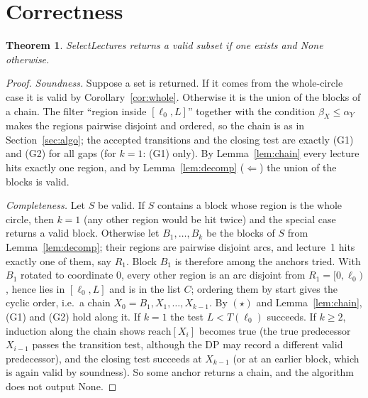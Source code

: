 \documentclass[11pt,a4paper]{article}
\newtheorem{theorem}{Theorem}
\theoremstyle{definition}
\theoremstyle{remark}
\newcommand{\Tf}{T}
\begin{document}
\section{Correctness}\label{sec:correct}
\begin{theorem}\label{thm:main}
\textsf{SelectLectures} returns a valid subset if one exists and \textsf{None} otherwise.
\end{theorem}
\begin{proof}
\emph{Soundness.} Suppose a set is returned.  If it comes from the whole-circle case it
is valid by Corollary~\ref{cor:whole}.  Otherwise it is the union of the blocks of a
chain.  The filter ``region inside $[\ell_0,L]$'' together with the condition
$\beta_X\le\alpha_Y$ makes the regions pairwise disjoint and ordered, so the chain is as
in Section~\ref{sec:algo}; the accepted transitions and the closing test are exactly
(G1) and (G2) for all gaps (for $k=1$: (G1) only).  By Lemma~\ref{lem:chain} every
lecture hits exactly one region, and by Lemma~\ref{lem:decomp} ($\Leftarrow$) the union of
the blocks is valid.

\emph{Completeness.} Let $S$ be valid.  If $S$ contains a block whose region is the
whole circle, then $k=1$ (any other region would be hit twice) and the special case
returns a valid block.  Otherwise let $B_1,\dots,B_k$ be the blocks of $S$ from
Lemma~\ref{lem:decomp}; their regions are pairwise disjoint arcs, and lecture~1 hits
exactly one of them, say $R_1$.  Block $B_1$ is therefore among the anchors tried.  With
$B_1$ rotated to coordinate $0$, every other region is an arc disjoint from
$R_1=[0,\ell_0)$, hence lies in $[\ell_0,L]$ and is in the list $C$; ordering them by
start gives the cyclic order, i.e.\ a chain $X_0=B_1,X_1,\dots,X_{k-1}$.  By $(\star)$
and Lemma~\ref{lem:chain}, (G1) and (G2) hold along it.  If $k=1$ the test
$L<\Tf(\ell_0)$ succeeds.  If $k\ge2$, induction along the chain shows
$\mathrm{reach}[X_i]$ becomes true (the true predecessor $X_{i-1}$ passes the
transition test, although the DP may record a different valid predecessor), and the
closing test succeeds at $X_{k-1}$ (or at an earlier block, which is again valid by
soundness).  So some anchor returns a chain, and the algorithm does not output
\textsf{None}.
\end{proof}

\end{document}
